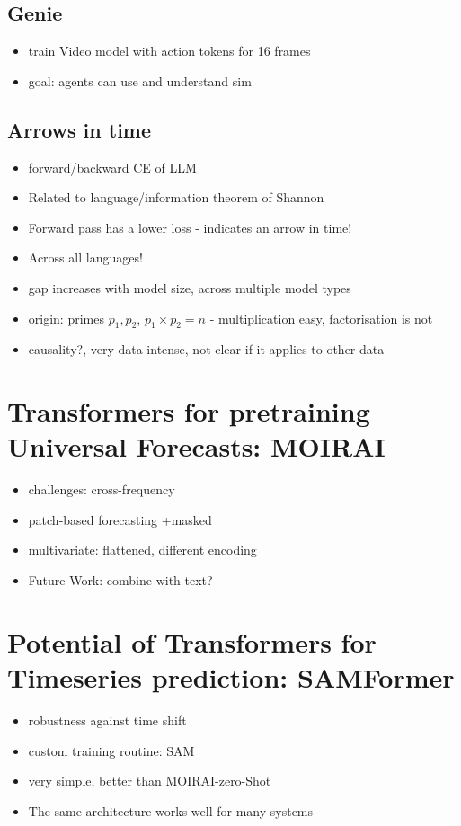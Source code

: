 \documentclass[a4paper]{article}
\begin{document}
\subsection*{Genie}
\begin{itemize}
    \item train Video model with action tokens for 16 frames
    \item goal: agents can use and understand sim
\end{itemize}
\subsection*{Arrows in time}
\begin{itemize}
    \item forward/backward CE of LLM
    \item Related to language/information theorem of Shannon
    \item Forward pass has a lower loss - indicates an arrow in time!
    \item Across all languages!
    \item gap increases with model size, across multiple model types
    \item origin: primes $p_1, p_2$, $p_1 \times p_2 =n$ - multiplication easy, factorisation is not
    \item causality?, very data-intense, not clear if it applies to other data
\end{itemize}
\section*{Transformers for pretraining Universal Forecasts: MOIRAI}
\begin{itemize}
    \item challenges: cross-frequency
    \item patch-based forecasting +masked
    \item multivariate: flattened, different encoding
    \item Future Work: combine with text?
\end{itemize}
\section*{Potential of Transformers for Timeseries prediction: SAMFormer}
\begin{itemize}
    \item robustness against time shift
    \item custom training routine: SAM
    \item very simple, better than MOIRAI-zero-Shot
    \item The same architecture works well for many systems
\end{itemize}
\end{document}
